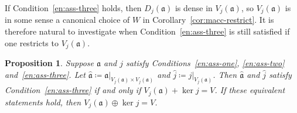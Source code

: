 \documentclass[a4paper,oneside,12pt]{amsart}
\theoremstyle{plain}
\newtheorem{proposition}[theorem]{Proposition}
\theoremstyle{definition}
\begin{document}
If Condition~\ref{en:ass-three} holds, then $D_j({{\mathfrak{{a}}}})$ is dense in $V_j({{\mathfrak{{a}}}})$, 
so $V_j({{\mathfrak{{a}}}})$ is in some sense a canonical choice of $W$ in Corollary~\ref{cor:macc-restrict}.
It is therefore natural to investigate when 
Condition~\ref{en:ass-three} is still satisfied if one restricts to $V_j({{\mathfrak{{a}}}})$.
\begin{proposition}
\label{prop:restrict-cond3}
Suppose ${{\mathfrak{{a}}}}$ and $j$ satisfy Conditions~\ref{en:ass-one}, \ref{en:ass-two} and~\ref{en:ass-three}. 
Let ${{\mathfrak{{\hat{a}}}}}\coloneqq{\ensuremath{{{{\mathfrak{{a}}}}}|_{{V_j({{\mathfrak{{a}}}})\times V_j({{\mathfrak{{a}}}})}}}}$ and $\hat{j}\coloneqq{\ensuremath{{j}|_{{V_j({{\mathfrak{{a}}}})}}}}$.
Then ${{\mathfrak{{\hat{a}}}}}$ and $\hat{j}$ satisfy Condition~\ref{en:ass-three} 
if and only if $V_j({{\mathfrak{{a}}}})+\ker j = V$.
If these equivalent statements hold, then $V_j({{\mathfrak{{a}}}})\oplus\ker j=V$.
\end{proposition}
\end{document}
